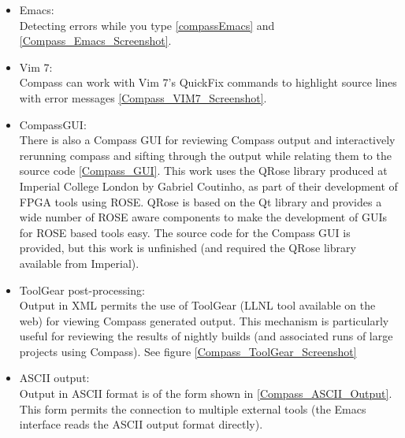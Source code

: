 \begin{itemize}
   \item Emacs: \\
         Detecting errors while you type \ref{compassEmacs} and \ref{Compass_Emacs_Screenshot}.
   \item Vim 7: \\
         Compass can work with Vim 7's QuickFix commands to
         highlight source lines with error messages \ref{Compass_VIM7_Screenshot}. 

   \item CompassGUI: \\
         There is also a Compass GUI for reviewing Compass output and interactively
         rerunning compass and sifting through the output while relating them to the source
         code \ref{Compass_GUI}. This work uses the QRose library produced at Imperial College
         London by Gabriel Coutinho, as part of their development of FPGA tools using ROSE.
         QRose is based on the Qt library and provides a wide number of ROSE aware components
         to make the development of GUIs for ROSE based tools easy.  The source code for the 
         Compass GUI is provided, but this work is unfinished (and required the QRose library
         available from Imperial).

   \item ToolGear post-processing: \\
         Output in XML permits the use of ToolGear (LLNL tool available on the web) for
         viewing Compass generated output.  This mechanism is particularly useful for reviewing
         the results of nightly builds (and associated runs of large projects using
         Compass). See figure \ref{Compass_ToolGear_Screenshot}

   \item ASCII output: \\
         Output in ASCII format is of the form shown in \ref{Compass_ASCII_Output}.  This
         form permits the connection to multiple external tools (the Emacs interface reads
         the ASCII output format directly).
 
\end{itemize}


